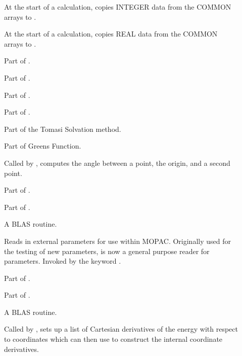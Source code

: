 \begin{description}
\item[] At the start of a calculation,  copies  INTEGER
data from the COMMON arrays to .

\item[] At the start of a calculation,   copies REAL
data from the COMMON arrays to .

\item[] Part of .

\item[] Part of .

\item[] Part of .

\item[] Part of .

\item[] Part of the Tomasi Solvation method.

\item[] Part of Greens Function.

\item[] Called by ,  computes the  angle
between a point, the origin, and a second point.

\item[] Part of .

\item[] Part of .

\item[] A BLAS routine.

\item[] Reads in external parameters for use within MOPAC. 
Originally used for the testing of new parameters,  is now a
general purpose reader for parameters. Invoked by the keyword .

\item[] Part of .

\item[] Part of .

\item[] A BLAS routine.

\item[] Called by ,  sets up a  list
of Cartesian derivatives of the energy with respect to coordinates which 
 can then use to construct the internal coordinate derivatives.


\end{description}
